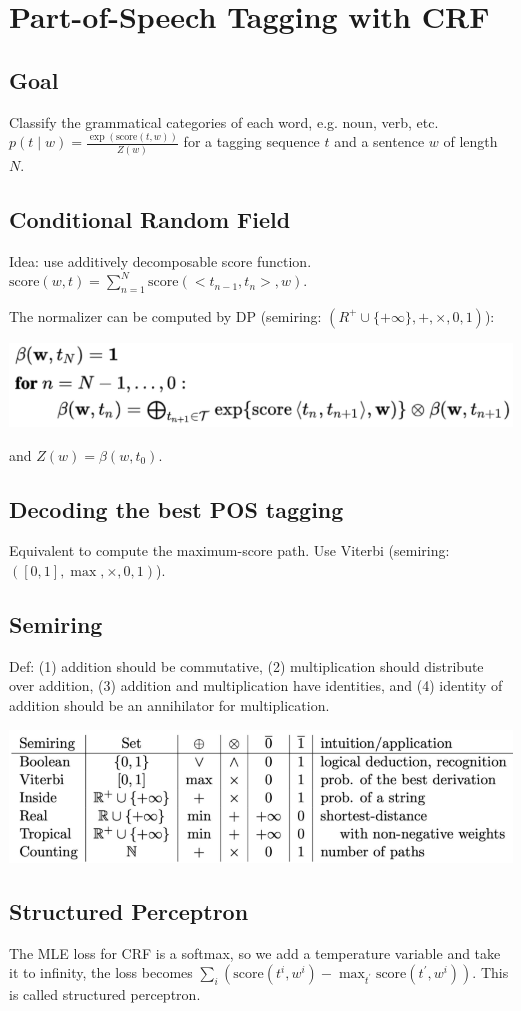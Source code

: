 \section{Part-of-Speech Tagging with CRF}

\subsection*{Goal}

Classify the grammatical categories of each word, e.g. noun, verb, etc.
$p(t\mid w) = \frac{\exp(\text{score}(t,w))}{Z(w)}$ for a tagging sequence $t$ and a sentence $w$ of length $N$.

\subsection*{Conditional Random Field}

Idea: use additively decomposable score function. $\text{score}(w,t) = \sum_{n=1}^{N} \text{score}(<t_{n-1}, t_n>, w)$.

The normalizer can be computed by DP (semiring: $(R^+ \cup \{+\infty\}, +, \times, 0, 1)$):
\begin{center}
    \includegraphics[width=.23\textwidth]{img/CRF-normalizer.png}
\end{center}
and $Z(w) = \beta(w, t_0)$.

\subsection*{Decoding the best POS tagging}

Equivalent to compute the maximum-score path. Use Viterbi (semiring: $([0,1], \max, \times, 0, 1)$).

\subsection*{Semiring}

Def: (1) addition should be commutative, (2) multiplication should distribute over addition, (3) addition and multiplication have identities, and (4) identity of addition should be an annihilator for multiplication.
\begin{center}
    \includegraphics[width=\columnwidth]{img/semiring.png}
\end{center}

\subsection*{Structured Perceptron}

The MLE loss for CRF is a softmax, so we add a temperature variable and take it to infinity, the loss becomes $\sum_i (\text{score}(t^i, w^i) - \max_{t^\prime} \text{score}(t^\prime, w^i))$. This is called structured perceptron.